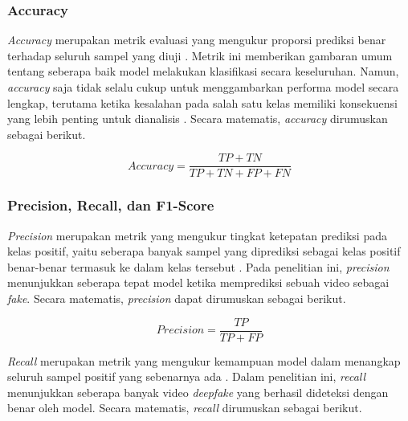 \subsubsection{Accuracy} \label{II.Teori7.2}
\textit{Accuracy} merupakan metrik evaluasi yang mengukur proporsi prediksi benar terhadap seluruh sampel yang diuji \cite{SOKOLOVA2009427}. Metrik ini memberikan gambaran umum tentang seberapa baik model melakukan klasifikasi secara keseluruhan. Namun, \textit{accuracy} saja tidak selalu cukup untuk menggambarkan performa model secara lengkap, terutama ketika kesalahan pada salah satu kelas memiliki konsekuensi yang lebih penting untuk dianalisis \cite{SOKOLOVA2009427,powers2020evaluationprecisionrecallfmeasure}. Secara matematis, \textit{accuracy} dirumuskan sebagai berikut.

\vspace{0.5\baselineskip}
\begin{equation}
\mathrm{\textit{Accuracy}} = \frac{TP + TN}{TP + TN + FP + FN}
\label{eq:accuracy}
\end{equation}
\vspace{0.5\baselineskip}

\subsubsection{Precision, Recall, dan F1-Score} \label{II.Teori7.3}
\textit{Precision} merupakan metrik yang mengukur tingkat ketepatan prediksi pada kelas positif, yaitu seberapa banyak sampel yang diprediksi sebagai kelas positif benar-benar termasuk ke dalam kelas tersebut \cite{SOKOLOVA2009427,powers2020evaluationprecisionrecallfmeasure}. Pada penelitian ini, \textit{precision} menunjukkan seberapa tepat model ketika memprediksi sebuah video sebagai \textit{fake}. Secara matematis, \textit{precision} dapat dirumuskan sebagai berikut.

\vspace{0.5\baselineskip}
\begin{equation}
\mathrm{\textit{Precision}} = \frac{TP}{TP + FP}
\label{eq:precision}
\end{equation}
\vspace{0.5\baselineskip}

\textit{Recall} merupakan metrik yang mengukur kemampuan model dalam menangkap seluruh sampel positif yang sebenarnya ada \cite{SOKOLOVA2009427,powers2020evaluationprecisionrecallfmeasure}. Dalam penelitian ini, \textit{recall} menunjukkan seberapa banyak video \textit{deepfake} yang berhasil dideteksi dengan benar oleh model. Secara matematis, \textit{recall} dirumuskan sebagai berikut.


